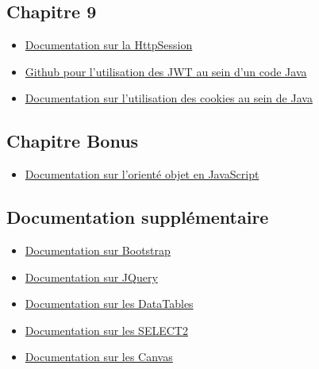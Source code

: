 \documentclass{article}[12pt]
\begin{document}
\subsection{Chapitre 9}
\begin{itemize}
	\item \href{https://docs.oracle.com/javaee/7/api/javax/servlet/http/HttpSession.html}{Documentation sur la HttpSession}
    \item \href{github.com/auth0/java-jwt}{Github pour l'utilisation des JWT au sein d'un code Java}
    \item \href{http://www.journaldev.com/1956/java-servlet-cookies-example}{Documentation sur l'utilisation des cookies au sein de Java}
\end{itemize}
\subsection{Chapitre Bonus}
\begin{itemize}
 \item \href{http://phrogz.net/js/classes/OOPinJS2.html}{Documentation sur l'orienté objet en JavaScript}
\end{itemize}
\subsection{Documentation supplémentaire}
\begin{itemize}
	\item \href{http://www.w3schools.com/bootstrap/}{Documentation sur Bootstrap}
    \item \href{https://jqueryui.com}{Documentation sur JQuery}
    \item \href{https://www.datatables.net}{Documentation sur les DataTables}
    \item \href{https://select2.github.io/examples.html}{Documentation sur les SELECT2}
    \item \href{http://www.w3schools.com/html/html5_canvas.asp}{Documentation sur les Canvas}
\end{itemize}
\end{document}
